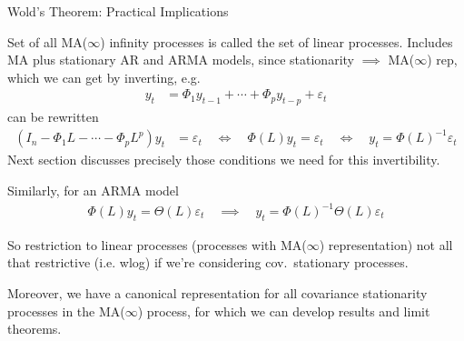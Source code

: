 \documentclass[aspectratio=169, handout]{beamer}
\begin{document}
{\footnotesize
\begin{frame}{Wold's Theorem: Practical Implications}

\begin{itemize}
  {\footnotesize
  \item
    Set of all MA($\infty$) infinity processes is called the set of
    \alert{linear processes}. Includes MA plus stationary AR
    and ARMA models, since stationarity $\implies$
    MA($\infty$) rep, which we can get by inverting, e.g.
    \begin{align*}
      y_t &= \Phi_1 y_{t-1} + \cdots + \Phi_py_{t-p} + \varepsilon_t
    \end{align*}
    can be rewritten
    \begin{align*}
      (I_n- \Phi_1 L - \cdots - \Phi_pL^p)y_t &=  \varepsilon_t
      \quad\iff\quad
      \Phi(L)y_t =  \varepsilon_t
      \quad\iff\quad
      y_t =  \Phi(L)^{-1}\varepsilon_t
    \end{align*}
    Next section discusses precisely those conditions we need for this
    invertibility.

    Similarly, for an ARMA model
    \begin{align*}
      \Phi(L)y_t = \Theta(L)\varepsilon_t
      \quad\implies\quad
      y_t = \Phi(L)^{-1}\Theta(L)\varepsilon_t
    \end{align*}



  \pause
  \item So restriction to linear processes (processes with MA($\infty$)
    representation) \alert{not all that restrictive} (i.e. wlog) if
    we're considering cov.\ stationary processes.

  \pause
  \item Moreover, we have a \alert{canonical representation} for all
    covariance stationarity processes in the MA($\infty$) process, for
    which we can develop results and limit theorems.

  }
\end{itemize}
\end{frame}
}
\end{document}

